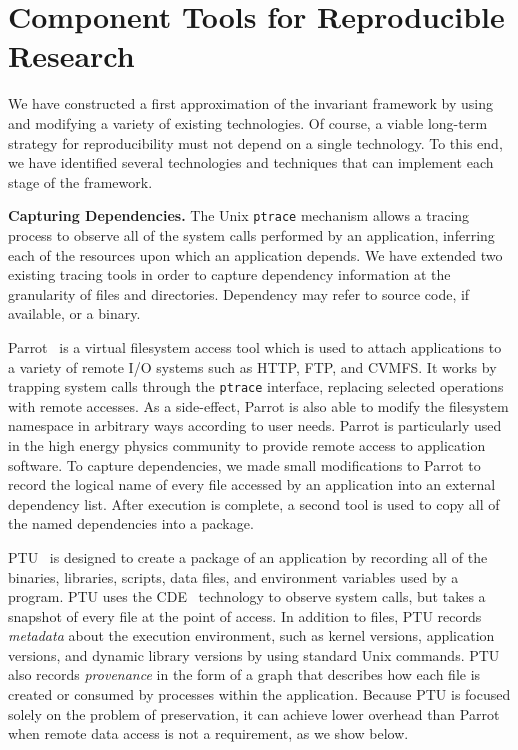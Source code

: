 \section{Component Tools for Reproducible Research}

We have constructed a first approximation of the invariant framework
by using and modifying a variety of existing technologies.  Of course,
a viable long-term strategy for reproducibility must not depend on a single
technology.
To this end, we have identified several technologies and techniques
that can implement each stage of the framework.

{\bf Capturing Dependencies.}  The Unix {\tt ptrace} mechanism
allows a tracing process to observe all of the system calls performed by
an application, inferring each of the resources upon which an application
depends.  We have extended two existing tracing tools in order to capture
dependency information at the granularity of files and directories. 
Dependency may refer to source code, if available, or a binary.

Parrot~\cite{thain2005parrot} is a virtual filesystem access tool which
is used to attach applications to a variety of remote I/O systems such as HTTP, FTP, and CVMFS. It works by trapping system calls through the {\tt ptrace} interface,
replacing selected operations with remote accesses.  As a side-effect, Parrot is
also able to modify the filesystem namespace in arbitrary ways according to user
needs.  Parrot is particularly used in the high energy physics community
to provide remote access to application software.
To capture dependencies, we made small modifications to Parrot to record
the logical name of every file accessed by an application into an external
dependency list.  After execution is complete, a second tool is used to copy
all of the named dependencies into a package.

PTU~\cite{PTU,pham2014framework} is designed to create a package of an application by recording all of the binaries, libraries, scripts, data files, and environment variables used by a program.   PTU uses the CDE~\cite{guo2011cde} technology to observe system calls, but takes a snapshot of every file at the point of access.  In addition to files, PTU records \emph{metadata} about the execution environment, such as kernel versions, application versions, and dynamic library versions by using standard Unix commands.  PTU also records \emph{provenance} in the form of a graph that describes how each file is created or consumed by processes within the application.  Because PTU is focused solely on the problem of preservation, it can achieve lower overhead than Parrot when remote data access is not a requirement, as we show below.

